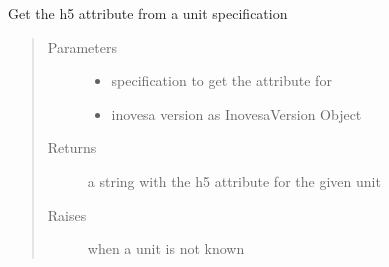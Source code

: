 \documentclass[letterpaper,10pt,openany,oneside,english]{sphinxmanual}
\begin{document}

\begin{fulllineitems}
\label{\detokenize{utils:utils.attr_from_unit}}
Get the h5 attribute from a unit specification
\begin{quote}\begin{description}
\item[{Parameters}] \leavevmode\begin{itemize}
\item {} 
 \textendash{} specification to get the attribute for

\item {} 
 \textendash{} inovesa version as InovesaVersion Object

\end{itemize}

\item[{Returns}] \leavevmode
a string with the h5 attribute for the given unit

\item[{Raises}] \leavevmode
{\hyperref[\detokenize{utils:utils.UnitError}]{}} \textendash{} when a unit is not known

\end{description}\end{quote}

\end{fulllineitems}

\end{document}
